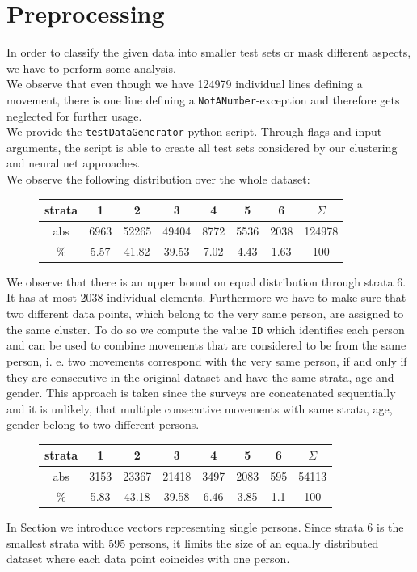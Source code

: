 \documentclass[runningheads]{llncs}
\begin{document}
	\section{Preprocessing}\label{sec: proprocessing}
	In order to classify the given data into smaller test sets or mask different aspects, we have to perform some analysis.\\
	We observe that even though we have 124979 individual lines defining a movement, there is one line defining a \texttt{NotANumber}-exception and therefore gets neglected for further usage.	\\
	We provide the \texttt{testDataGenerator} python script. Through flags and input arguments, the script is able to create all test sets considered by our clustering and neural net approaches.\\
	We observe the following distribution over the whole dataset:\\
	\begin{figure}[H]
		\centering
		\setlength\tabcolsep{.2cm}
		\begin{tabular}{c|ccccccc}
			strata &  1   &   2   &   3   &  4   &  5   &  6   & $\Sigma$ \\ \hline
			abs   & 6963 & 52265 & 49404 & 8772 & 5536 & 2038 &  124978  \\
			\%   & 5.57 & 41.82 & 39.53 & 7.02 & 4.43 & 1.63 &   100
		\end{tabular}
		\label{table: distribution normal}
	\end{figure}
	We observe that there is an upper bound on equal distribution through strata 6. It has at most 2038 individual elements.
	Furthermore we have to make sure that  two different data points, which belong to the very same person, are assigned to the same cluster. To do so we compute the value \texttt{ID} which identifies each person and can be used to combine movements that are considered to be from the same person, i. e. two movements correspond with the very same person, if and only if they are consecutive in the original dataset and have the same strata, age and gender. This approach is taken since the surveys are concatenated sequentially and it is unlikely, that multiple consecutive movements with same strata, age, gender belong to two different persons.
	\begin{figure}[H]
		\centering
		\setlength\tabcolsep{.2cm}
		\begin{tabular}{c|ccccccc}
			strata &  1   &   2   &   3   &  4   &  5   &  6  & $\Sigma$ \\ \hline
			abs   & 3153 & 23367 & 21418 & 3497 & 2083 & 595 &  54113   \\
			\%   & 5.83 & 43.18 & 39.58 & 6.46 & 3.85 & 1.1 &   100
		\end{tabular}
	\end{figure}
	In Section  we introduce vectors representing single persons. Since strata 6 is the smallest strata with 595 persons, it limits the size of an equally distributed dataset where each data point coincides with one person.
	
\end{document}
